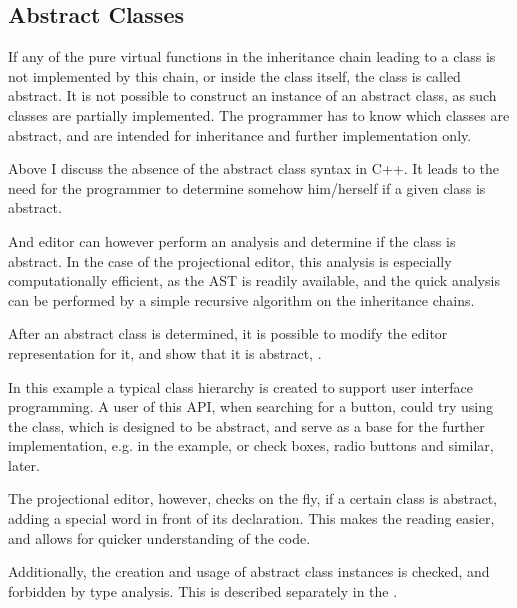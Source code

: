 \subsection{Abstract Classes}
\label{abstractclasses}

If any of the pure virtual functions in the inheritance chain leading to a class is not implemented by this chain, 
or inside the class itself, the class is called abstract. It is not possible to construct an instance of an
abstract class, as such classes are partially implemented. The programmer has to know which classes are abstract,
and are intended for inheritance and further implementation only.

Above I discuss the absence of the abstract class syntax in C++. It leads to the need for the programmer to 
determine somehow him/herself if a given class is abstract. 

And editor can however perform an analysis and determine if the class is abstract. In the case of the projectional
editor, this analysis is especially computationally efficient, as the AST is readily available, and the quick 
analysis can be performed by a simple recursive algorithm on the inheritance chains.

After an abstract class is determined, it is possible to modify the editor representation for it, and show that it is 
abstract, .

In this example a typical class hierarchy is created to support user interface programming. A user of this API, when 
searching for a button, could try using the  class, which is designed to be abstract, and serve as a 
base for the further implementation, e.g.  in the example, or check boxes, radio buttons and similar,
later.


The projectional editor, however, checks on the fly, if a certain class is abstract, adding a special  word 
in front of its declaration. This makes the reading easier, and allows for quicker understanding of the code. 

Additionally, the creation and usage of abstract class instances is checked, and forbidden by type analysis. This is 
described separately in the .